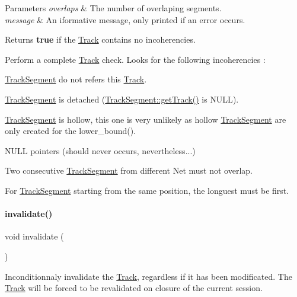 \begin{DoxyParams}{Parameters}
{\em overlaps} & The number of overlaping segments. \\
\hline
{\em message} & An iformative message, only printed if an error occurs. \\
\hline
\end{DoxyParams}
\begin{DoxyReturn}{Returns}
{\bfseries true} if the \hyperlink{classKite_1_1Track}{Track} contains no incoherencies.
\end{DoxyReturn}
Perform a complete \hyperlink{classKite_1_1Track}{Track} check. Looks for the following incoherencies \+:
\begin{DoxyItemize}
\item \hyperlink{classKite_1_1TrackSegment}{Track\+Segment} do not refers this \hyperlink{classKite_1_1Track}{Track}.
\item \hyperlink{classKite_1_1TrackSegment}{Track\+Segment} is detached (\hyperlink{classKite_1_1TrackElement_a3f34f9139b8491a0adb531ac3a904171}{Track\+Segment\+::get\+Track()} is {\ttfamily N\+U\+LL}).
\item \hyperlink{classKite_1_1TrackSegment}{Track\+Segment} is hollow, this one is very unlikely as hollow \hyperlink{classKite_1_1TrackSegment}{Track\+Segment} are only created for the {\ttfamily lower\+\_\+bound()}.
\item {\ttfamily N\+U\+LL} pointers (should never occurs, nevertheless...)
\item Two consecutive \hyperlink{classKite_1_1TrackSegment}{Track\+Segment} from different {\ttfamily Net} must not overlap.
\item For \hyperlink{classKite_1_1TrackSegment}{Track\+Segment} starting from the same position, the longuest must be first. 
\end{DoxyItemize}\mbox{\label{classKite_1_1Track_a893f1101c650c08c98612515c2b1a89c}} 
\paragraph{\texorpdfstring{invalidate()}{invalidate()}}
{\footnotesize\ttfamily void invalidate (\begin{DoxyParamCaption}{ }\end{DoxyParamCaption})}

Inconditionnaly invalidate the \hyperlink{classKite_1_1Track}{Track}, regardless if it has been modificated. The \hyperlink{classKite_1_1Track}{Track} will be forced to be revalidated on closure of the current session. \mbox{\label{classKite_1_1Track_aa392ba7cf1e3e485aac11cf326e31918}} 
